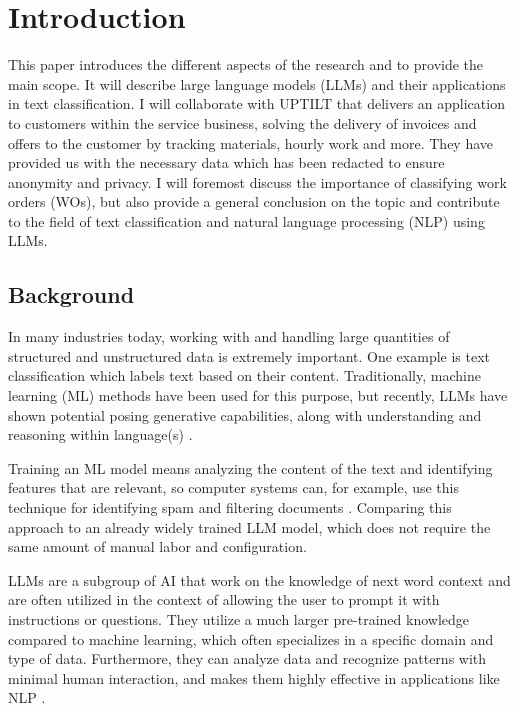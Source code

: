 \section{Introduction}

This paper introduces the different aspects of the research and to provide the main
scope. It will describe large language models (LLMs) and their applications in
text classification. I will collaborate with UPTILT that delivers an application
to customers within the service business, solving the delivery of invoices and
offers to the customer by tracking materials, hourly work and more. They have
provided us with the necessary data which has been redacted to ensure anonymity
and privacy. I will foremost discuss the importance of classifying work orders (WOs),
but also provide a general conclusion on the topic and contribute to the field
of text classification and natural language processing (NLP) using LLMs.

\subsection{Background}

In many industries today, working with and handling large quantities of
structured and unstructured data is extremely important. One example is text classification
which labels text based on their content. Traditionally, machine learning (ML) methods
have been used for this purpose, but recently, LLMs have shown potential posing generative
capabilities, along with understanding and reasoning within language(s) \cite{huang2024}
\cite{zhang2024}.

Training an ML model means analyzing the content of the text and identifying features
that are relevant, so computer systems can, for example, use this technique for
identifying spam and filtering documents \cite{dalal2011}. Comparing this approach
to an already widely trained LLM model, which does not require the same amount
of manual labor and configuration.

LLMs are a subgroup of AI that work on the knowledge of next word context and
are often utilized in the context of allowing the user to prompt it with
instructions or questions. They utilize a much larger pre-trained knowledge compared
to machine learning, which often specializes in a specific domain and type of
data. Furthermore, they can analyze data and recognize patterns with minimal
human interaction, and makes them highly effective in applications like NLP \cite{andersson2024}.

